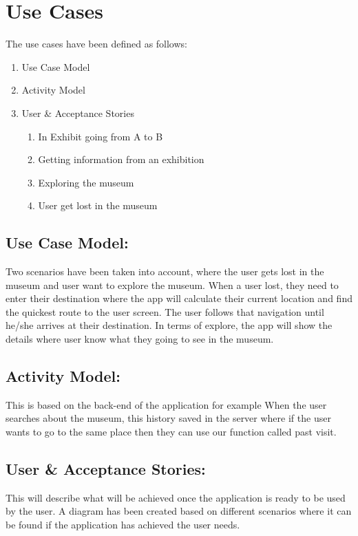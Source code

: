 \section{Use Cases}
The use cases have been defined as follows:
\begin{enumerate}
    \item Use Case Model
    \item Activity Model
    \item User & Acceptance Stories
    \begin{enumerate}
        \item In Exhibit going from A to B
        \item Getting information from an exhibition
        \item Exploring the museum
        \item User get lost in the museum
    \end{enumerate}
\end{enumerate}

\subsection{Use Case Model:}
Two scenarios have been taken into account, where the user gets lost in the museum and user want to explore the museum. When a user lost, they need to enter their destination where the app will calculate their current location and find the quickest route to the user screen. The user follows that navigation until he/she arrives at their destination. In terms of explore, the app will show the details where user know what they going to see in the museum.

\subsection{Activity Model:}
This is based on the back-end of the application for example When the user searches about the museum, this history saved in the server where if the user wants to go to the same place then they can use our function called past visit.

\subsection{User & Acceptance Stories:}
This will describe what will be achieved once the application is ready to be used by the user. A diagram has been created based on different scenarios where it can be found if the application has achieved the user needs. 

